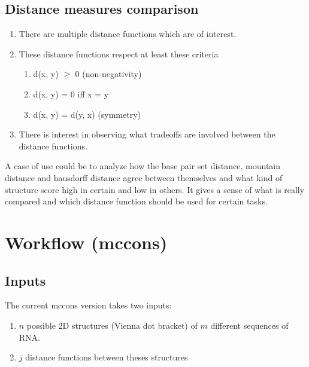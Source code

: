 \documentclass[a4paper, 12pt] {article}
\begin{document}
\subsection*{Distance measures comparison}
\begin{enumerate}
  \item There are multiple distance functions which are of interest.
  \item These distance functions respect at least these criteria 
    \begin{enumerate}
      \item d(x, y) $\geq$ 0 (non-negativity)
      \item d(x, y) = 0 iff x = y 
      \item d(x, y) = d(y, x) (symmetry)
    \end{enumerate}
  \item There is interest in observing what tradeoffs are involved between the distance functions.
\end{enumerate}
A case of use could be to analyze how the base pair set distance, mountain distance and hausdorff distance
agree between themselves and what kind of structure score high in certain and low in others. It gives a sense
of what is really compared and which distance function should be used for certain tasks.\\

\noindent
\section*{Workflow (mccons)}
\subsection*{Inputs}
\noindent
The current mccons version takes two inputs:

\begin{enumerate}
  \item $n$ possible 2D structures (Vienna dot bracket) of $m$ different sequences of RNA.
  \item $j$ distance functions between theses structures 
\end{enumerate}
\noindent

\end{document}
